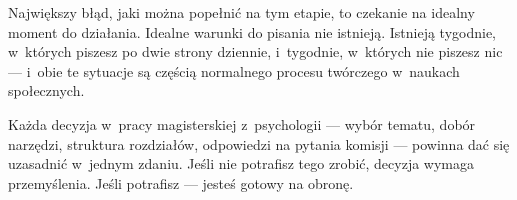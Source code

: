 \documentclass[12pt,a4paper,twoside,openany]{book}
\begin{document}
Największy błąd, jaki można popełnić na tym etapie, to czekanie na idealny moment do działania. Idealne warunki do pisania nie istnieją. Istnieją tygodnie, w~których piszesz po dwie strony dziennie, i~tygodnie, w~których nie piszesz nic --- i~obie te sytuacje są częścią normalnego procesu twórczego w~naukach społecznych.

\begin{keyinsight}
Każda decyzja w~pracy magisterskiej z~psychologii --- wybór tematu, dobór narzędzi, struktura rozdziałów, odpowiedzi na pytania komisji --- powinna dać się uzasadnić w~jednym zdaniu. Jeśli nie potrafisz tego zrobić, decyzja wymaga przemyślenia. Jeśli potrafisz --- jesteś gotowy na obronę.
\end{keyinsight}
\clearpage
\end{document}
